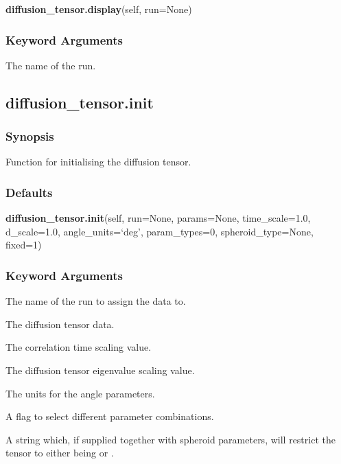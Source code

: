 \textsf{\textbf{diffusion\_tensor.display}(self, run=None)}


\subsubsection{Keyword Arguments}

  The name of the run. 





\newpage

\subsection{diffusion\_tensor.init}


\subsubsection{Synopsis}

Function for initialising the diffusion tensor.



\subsubsection{Defaults}

\textsf{\textbf{diffusion\_tensor.init}(self, run=None, params=None, time\_scale=1.0, d\_scale=1.0, angle\_units=`deg', param\_types=0, spheroid\_type=None, fixed=1)}


\subsubsection{Keyword Arguments}

  The name of the run to assign the data to. 

  The diffusion tensor data. 

  The correlation time scaling value. 

  The diffusion tensor eigenvalue scaling value. 

  The units for the angle parameters. 

  A flag to select different parameter combinations. 

  A string which, if supplied together with spheroid parameters, will restrict the tensor to either being  or . 

